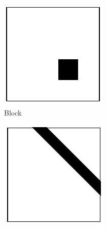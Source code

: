 \begin{figure}
    \centering
    \begin{subfigure}[b]{0.25\textwidth}
        \includegraphics[width=\textwidth]{Figures/block-failure-pattern.pdf}
        \caption{Block}
        \label{fig:block-failure-pattern}
    \end{subfigure}
    \begin{subfigure}[b]{0.25\textwidth}
        \includegraphics[width=\textwidth]{Figures/strip-failure-pattern.pdf}

\end{subfigure}
\end{figure}
